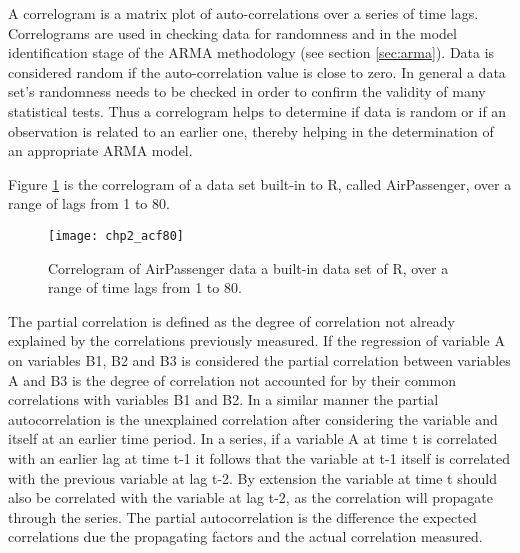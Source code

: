 A correlogram is a matrix plot of auto-correlations over a series of time lags.  Correlograms are used in checking data for randomness and in the model identification stage of the ARMA methodology (see section \ref{sec:arma}). Data is considered random if the auto-correlation value is close to zero.  In general a data set's randomness needs to be checked in order to confirm the validity of many statistical tests. Thus a correlogram helps to determine if data is random or if an observation is related to an earlier one, thereby helping in the determination of an appropriate ARMA model. 

Figure \ref{fig:acf80} is the correlogram of a data set built-in to R, called AirPassenger, over a range of lags from 1 to 80.


\begin{figure}[tbph!]
\centering
\texttt{[image: chp2\_acf80]}
\caption[Correlogram of auto-correlations]{Correlogram of AirPassenger data a built-in data set of R, over a range of time lags from 1 to 80.}
\label{fig:acf80}
\end{figure}


The partial correlation is defined as the degree of correlation not already explained by the correlations previously measured. If the regression of variable A on variables B1, B2 and B3 is considered the partial correlation between variables A and B3 is the degree of correlation not accounted for by their common correlations with variables B1 and B2. In a similar manner the partial autocorrelation is the unexplained correlation after considering the variable and itself at an earlier time period. In a series, if a variable A at time t is correlated with an earlier lag at time t-1 it follows that the variable at t-1 itself is correlated with the previous variable at lag t-2. By extension the variable at time t should also be correlated with the variable at lag t-2, as the correlation will propagate through the series. The partial autocorrelation is the difference the expected correlations due the propagating factors and the actual correlation measured.

